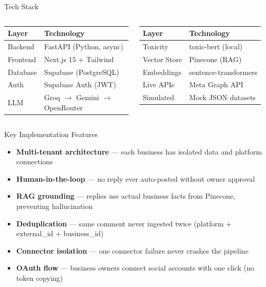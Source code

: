 \documentclass[aspectratio=169]{beamer}
\begin{document}
\begin{frame}{Tech Stack}
  \begin{columns}
    \begin{table}
      \small
      \begin{tabular}{@{}ll@{}}
        \toprule
        \textbf{Layer} & \textbf{Technology} \\
        \midrule
        Backend & FastAPI (Python, async) \\
        Frontend & Next.js 15 + Tailwind \\
        Database & Supabase (PostgreSQL) \\
        Auth & Supabase Auth (JWT) \\
        LLM & Groq $\to$ Gemini $\to$ OpenRouter \\
        \bottomrule
      \end{tabular}
    \end{table}

    \begin{table}
      \small
      \begin{tabular}{@{}ll@{}}
        \toprule
        \textbf{Layer} & \textbf{Technology} \\
        \midrule
        Toxicity & toxic-bert (local) \\
        Vector Store & Pinecone (RAG) \\
        Embeddings & sentence-transformers \\
        Live APIs & Meta Graph API \\
        Simulated & Mock JSON datasets \\
        \bottomrule
      \end{tabular}
    \end{table}
  \end{columns}
\end{frame}

\begin{frame}{Key Implementation Features}
  \begin{itemize}
    \item \textbf{Multi-tenant architecture} — each business has isolated data and platform connections
    \item \textbf{Human-in-the-loop} — no reply ever auto-posted without owner approval
    \item \textbf{RAG grounding} — replies use actual business facts from Pinecone, preventing hallucination
    \item \textbf{Deduplication} — same comment never ingested twice (platform + external\_id + business\_id)
    \item \textbf{Connector isolation} — one connector failure never crashes the pipeline
    \item \textbf{OAuth flow} — business owners connect social accounts with one click (no token copying)
  \end{itemize}
\end{frame}
\end{document}
